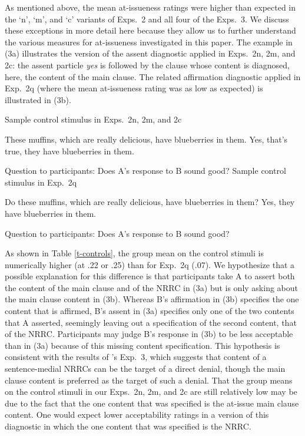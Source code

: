 \documentclass[11pt,fleqn]{article}
\newcommand{\6}{\mbox{$[\hspace*{-.6mm}[$}}
\newcommand{\9}{\mbox{$]\hspace*{-.6mm}]$}}
\newcommand{\citepos}[1]{\citeauthor{#1}'s \citeyear{#1}}
\begin{document}
  As mentioned above, the mean at-issueness ratings were higher than expected in the `n', `m', and `c' variants of Exps.~2 and all four of the Exps.~3. We discuss these exceptions in more detail here because they allow us to further understand the various measures for at-issueness investigated in this paper. The example in (3a) illustrates the version of the assent diagnostic applied in Exps.~2n, 2m, and 2c: the assent particle {\em yes} is followed by the clause whose content is diagnosed, here, the content of the main clause. The related affirmation diagnostic applied in Exp.~2q (where the mean at-issueness rating was as low as expected) is illustrated in (3b).

  \begin{exe}
  \begin{xlist}
  \ex Sample control stimulus in Exps.~2n, 2m, and 2c
  \begin{xlist}
   These muffins, which are really delicious, have blueberries in them.
   Yes, that's true, they have blueberries in them.
  \end{xlist}
  Question to participants: Does A's response to B sound good?
  \ex Sample control stimulus in Exp.~2q
  \begin{xlist}
   Do these muffins, which are really delicious, have blueberries in them?
   Yes, they have blueberries in them.
  \end{xlist}
  Question to participants: Does A's response to B sound good?
  \end{xlist}
  \end{exe}

  As shown in Table \ref{t-controls},  the group mean on the control stimuli is numerically higher (at .22 or .25) than for Exp.~2q (.07). We hypothesize that a possible explanation for this difference is that participants take A to assert both the content of the main clause and of the NRRC in (3a) but is only asking about the main clause content in (3b). Whereas B's affirmation in (3b) specifies the one content that is affirmed, B's assent in (3a) specifies only one of the two contents that A asserted, seemingly leaving out a specification of the second content, that of the NRRC. Participants may judge B's response in (3b) to be less acceptable than in (3a) because of this missing content specification. This hypothesis is consistent with the results of \citepos{syrett-koev2015} Exp.~3, which suggests that content of a sentence-medial NRRCs can be the target of a direct denial, though the main clause content is preferred as the target of such a denial. That the group means on the control stimuli in our Exps.~2n, 2m, and 2c are still relatively low may be due to the fact that the one content that was specified is the at-issue main clause content. One would expect lower acceptability ratings in a version of this diagnostic in which the one content that was specified is the NRRC. 
\end{document}
